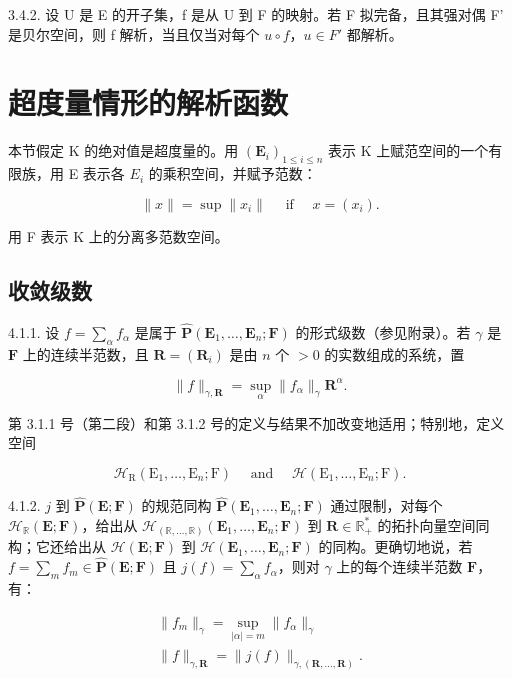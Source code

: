 3.4.2. 设 U 是 E 的开子集，f 是从 U 到 F 的映射。若 F 拟完备，且其强对偶 F' 是贝尔空间，则 f 解析，当且仅当对每个 \(u \circ f\)，\(u \in F'\) 都解析。

\section{超度量情形的解析函数}

本节假定 K 的绝对值是超度量的。用 \((\mathbf{E}_{i})_{1\leqslant i\leqslant n}\) 表示 K 上赋范空间的一个有限族，用 E 表示各 \(E_{i}\) 的乘积空间，并赋予范数：

\[
\| x \| = \sup \| x _ {i} \| \quad \text { if } \quad x = (x _ {i}).
\]

用 F 表示 K 上的分离多范数空间。

\subsection{收敛级数}

4.1.1. 设 \(f = \sum_{\alpha} f_{\alpha}\) 是属于 \(\hat{\mathbf{P}}(\mathbf{E}_1, \ldots, \mathbf{E}_n; \mathbf{F})\) 的形式级数（参见附录）。若 \(\gamma\) 是 \(\mathbf{F}\) 上的连续半范数，且 \(\mathbf{R} = (\mathbf{R}_i)\) 是由 \(n\) 个 \(>0\) 的实数组成的系统，置

\[
\| f \| _ {\gamma , \mathbf {R}} = \sup _ {\alpha} \| f _ {\alpha} \| _ {\gamma} \mathbf {R} ^ {\alpha}.
\]

第 3.1.1 号（第二段）和第 3.1.2 号的定义与结果不加改变地适用；特别地，定义空间

\[
\mathcal {H} _ {\mathrm{R}} (\mathrm{E} _ {1}, \dots , \mathrm{E} _ {n}; \mathrm{F}) \quad \text { and } \quad \mathcal {H} (\mathrm{E} _ {1}, \dots , \mathrm{E} _ {n}; \mathrm{F}).
\]

4.1.2. \(j\) 到 \(\hat{\mathbf{P}}(\mathbf{E};\mathbf{F})\) 的规范同构 \(\hat{\mathbf{P}}(\mathbf{E}_{1},\ldots,\mathbf{E}_{n};\mathbf{F})\) 通过限制，对每个 \(\mathcal{H}_{\mathbb{R}}(\mathbf{E};\mathbf{F})\)，给出从 \(\mathcal{H}_{(\mathbb{R},\ldots,\mathbb{R})}(\mathbf{E}_{1},\ldots,\mathbf{E}_{n};\mathbf{F})\) 到 \(\mathbf{R}\in\mathbb{R}_{+}^{*}\) 的拓扑向量空间同构；它还给出从 \(\mathcal{H}(\mathbf{E};\mathbf{F})\) 到 \(\mathcal{H}(\mathbf{E}_{1},\ldots,\mathbf{E}_{n};\mathbf{F})\) 的同构。更确切地说，若 \(f=\sum_{m}f_{m}\in\hat{\mathbf{P}}(\mathbf{E};\mathbf{F})\) 且 \(j(f)=\sum_{\alpha}f_{\alpha}\)，则对 \(\gamma\) 上的每个连续半范数 \(\mathbf{F}\)，有：

\[
\begin{array}{l} \| f _ {m} \| _ {\gamma} = \sup _ {| \alpha | = m} \| f _ {\alpha} \| _ {\gamma} \\ \| f \| _ {\gamma , \mathbf {R}} = \| j (f) \| _ {\gamma , (\mathbf {R}, \dots , \mathbf {R})}. \end{array}
\]

